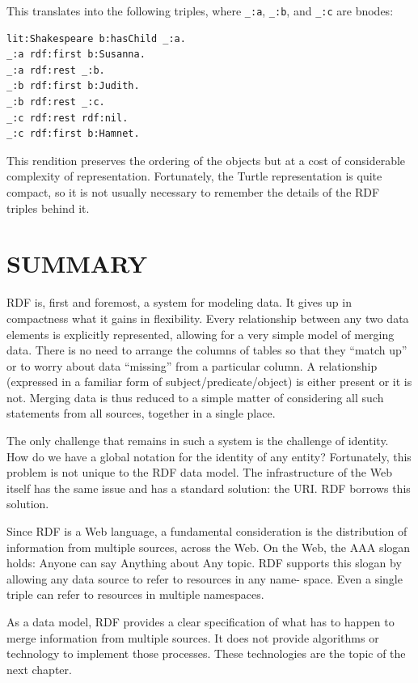 This translates into the following triples, where \texttt{\_:a}, \texttt{\_:b}, and \texttt{\_:c}
are bnodes:

\begin{lstlisting}
lit:Shakespeare b:hasChild _:a.
_:a rdf:first b:Susanna.
_:a rdf:rest _:b.
_:b rdf:first b:Judith.
_:b rdf:rest _:c.
_:c rdf:rest rdf:nil.
_:c rdf:first b:Hamnet.
\end{lstlisting}

This rendition preserves the ordering of the objects but at a cost of
considerable complexity of representation. Fortunately, the Turtle
representation is quite compact, so it is not usually necessary to
remember the details of the RDF triples behind it.

\section{SUMMARY}

RDF is, first and foremost, a system for modeling data. It gives up in
compactness what it gains in flexibility. Every relationship between any
two data elements is explicitly represented, allowing for a very simple
model of merging data. There is no need to arrange the columns of tables
so that they ``match up'' or to worry about data ``missing'' from a
particular column. A relationship (expressed in a familiar form of
subject/predicate/object) is either present or it is not. Merging data
is thus reduced to a simple matter of considering all such statements
from all sources, together in a single place.

The only challenge that remains in such a system is the challenge of
identity. How do we have a global notation for the identity of any
entity? Fortunately, this problem is not unique to the RDF data model.
The infrastructure of the Web itself has the same issue and has a
standard solution: the URI. RDF borrows this solution.

Since RDF is a Web language, a fundamental consideration is the
distribution of information from multiple sources, across the Web. On
the Web, the AAA slogan holds: Anyone can say Anything about Any topic.
RDF supports this slogan by allowing any data source to refer to
resources in any name- space. Even a single triple can refer to
resources in multiple namespaces.

As a data model, RDF provides a clear specification of what has to
happen to merge information from multiple sources. It does not provide
algorithms or technology to implement those processes. These
technologies are the topic of the next chapter.


